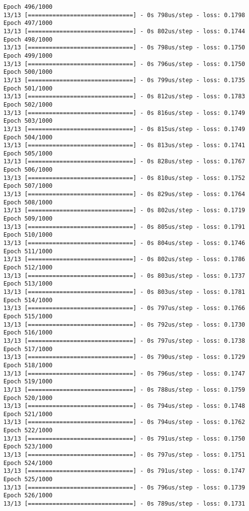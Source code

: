 \documentclass[11pt]{article}
\begin{document}
\begin{Verbatim}[commandchars=\\\{\}]
Epoch 496/1000
13/13 [==============================] - 0s 798us/step - loss: 0.1798
Epoch 497/1000
13/13 [==============================] - 0s 802us/step - loss: 0.1744
Epoch 498/1000
13/13 [==============================] - 0s 798us/step - loss: 0.1750
Epoch 499/1000
13/13 [==============================] - 0s 796us/step - loss: 0.1750
Epoch 500/1000
13/13 [==============================] - 0s 799us/step - loss: 0.1735
Epoch 501/1000
13/13 [==============================] - 0s 812us/step - loss: 0.1783
Epoch 502/1000
13/13 [==============================] - 0s 816us/step - loss: 0.1749
Epoch 503/1000
13/13 [==============================] - 0s 815us/step - loss: 0.1749
Epoch 504/1000
13/13 [==============================] - 0s 813us/step - loss: 0.1741
Epoch 505/1000
13/13 [==============================] - 0s 828us/step - loss: 0.1767
Epoch 506/1000
13/13 [==============================] - 0s 810us/step - loss: 0.1752
Epoch 507/1000
13/13 [==============================] - 0s 829us/step - loss: 0.1764
Epoch 508/1000
13/13 [==============================] - 0s 802us/step - loss: 0.1719
Epoch 509/1000
13/13 [==============================] - 0s 805us/step - loss: 0.1791
Epoch 510/1000
13/13 [==============================] - 0s 804us/step - loss: 0.1746
Epoch 511/1000
13/13 [==============================] - 0s 802us/step - loss: 0.1786
Epoch 512/1000
13/13 [==============================] - 0s 803us/step - loss: 0.1737
Epoch 513/1000
13/13 [==============================] - 0s 803us/step - loss: 0.1781
Epoch 514/1000
13/13 [==============================] - 0s 797us/step - loss: 0.1766
Epoch 515/1000
13/13 [==============================] - 0s 792us/step - loss: 0.1730
Epoch 516/1000
13/13 [==============================] - 0s 797us/step - loss: 0.1738
Epoch 517/1000
13/13 [==============================] - 0s 790us/step - loss: 0.1729
Epoch 518/1000
13/13 [==============================] - 0s 796us/step - loss: 0.1747
Epoch 519/1000
13/13 [==============================] - 0s 788us/step - loss: 0.1759
Epoch 520/1000
13/13 [==============================] - 0s 794us/step - loss: 0.1748
Epoch 521/1000
13/13 [==============================] - 0s 794us/step - loss: 0.1762
Epoch 522/1000
13/13 [==============================] - 0s 791us/step - loss: 0.1750
Epoch 523/1000
13/13 [==============================] - 0s 797us/step - loss: 0.1751
Epoch 524/1000
13/13 [==============================] - 0s 791us/step - loss: 0.1747
Epoch 525/1000
13/13 [==============================] - 0s 796us/step - loss: 0.1739
Epoch 526/1000
13/13 [==============================] - 0s 789us/step - loss: 0.1731

\end{Verbatim}
\end{document}
